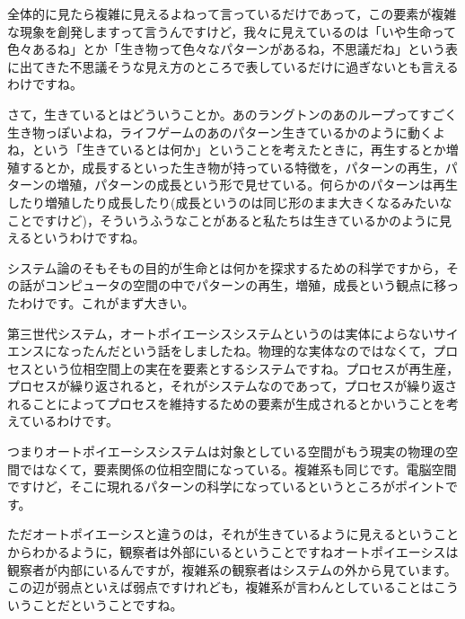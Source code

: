 \documentclass{ltjsbook}
\begin{document}
全体的に見たら複雑に見えるよねって言っているだけであって，この要素が複雑な現象を創発しますって言うんですけど，我々に見えているのは「いや生命って色々あるね」とか「生き物って色々なパターンがあるね，不思議だね」という表に出てきた不思議そうな見え方のところで表しているだけに過ぎないとも言えるわけですね。

さて，生きているとはどういうことか。あのラングトンのあのループってすごく生き物っぽいよね，ライフゲームのあのパターン生きているかのように動くよね，という「生きているとは何か」ということを考えたときに，再生するとか増殖するとか，成長するといった生き物が持っている特徴を，パターンの再生，パターンの増殖，パターンの成長という形で見せている。何らかのパターンは再生したり増殖したり成長したり(成長というのは同じ形のまま大きくなるみたいなことですけど)，そういうふうなことがあると私たちは生きているかのように見えるというわけですね。

システム論のそもそもの目的が生命とは何かを探求するための科学ですから，その話がコンピュータの空間の中でパターンの再生，増殖，成長という観点に移ったわけです。これがまず大きい。

第三世代システム，オートポイエーシスシステムというのは実体によらないサイエンスになったんだという話をしましたね。物理的な実体なのではなくて，プロセスという位相空間上の実在を要素とするシステムですね。プロセスが再生産，プロセスが繰り返されると，それがシステムなのであって，プロセスが繰り返されることによってプロセスを維持するための要素が生成されるとかいうことを考えているわけです。

つまりオートポイエーシスシステムは対象としている空間がもう現実の物理の空間ではなくて，要素関係の位相空間になっている。複雑系も同じです。電脳空間ですけど，そこに現れるパターンの科学になっているというところがポイントです。

ただオートポイエーシスと違うのは，それが生きているように見えるということからわかるように，観察者は外部にいるということですねオートポイエーシスは観察者が内部にいるんですが，複雑系の観察者はシステムの外から見ています。この辺が弱点といえば弱点ですけれども，複雑系が言わんとしていることはこういうことだということですね。
\end{document}
